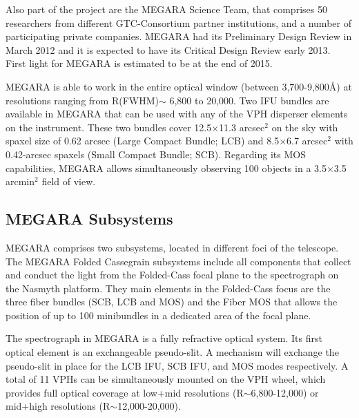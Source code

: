 Also part of the project are the MEGARA Science Team, that comprises 50 researchers from different GTC-Consortium partner institutions, and a number of participating private companies.  MEGARA had its Preliminary Design Review in March 2012 and it is expected to have its Critical Design Review early 2013. First light for MEGARA is estimated to be at the end of 2015.

MEGARA is able to work in the entire optical window (between 3,700-9,800\AA) at resolutions ranging from R(FWHM)$\sim$ 6,800 to 20,000. Two IFU bundles are available in MEGARA that can be used with any of the VPH disperser elements on the instrument. These two bundles cover 12.5$\times$11.3 arcsec$^2$ on the sky with spaxel size of 0.62 arcsec (Large Compact Bundle; LCB) and 8.5$\times$6.7 arcsec$^2$ with 0.42-arcsec spaxels (Small Compact Bundle; SCB). Regarding its MOS capabilities, MEGARA allows simultaneously observing 100 objects in a 3.5$\times$3.5 arcmin$^2$ field of view. 

\subsection{MEGARA Subsystems}
MEGARA comprises two subsystems, located in different foci of the telescope. The MEGARA Folded Cassegrain subsystems include all components that collect and conduct the light from the Folded-Cass focal plane to the spectrograph on the Nasmyth platform. They main elements in the Folded-Cass focus are the three fiber bundles (SCB, LCB and MOS) and the Fiber MOS that allows the position of up to 100 minibundles in a dedicated area of the focal plane.

The spectrograph in MEGARA is a fully refractive optical system. Its first optical element is an exchangeable pseudo-slit. A mechanism will exchange the pseudo-slit in place for the LCB IFU, SCB IFU, and MOS modes respectively. A total of 11 VPHs can be simultaneously mounted on the VPH wheel, which  provides full optical coverage at low+mid resolutions (R$\sim$6,800-12,000) or mid+high
resolutions (R$\sim$12,000-20,000).

